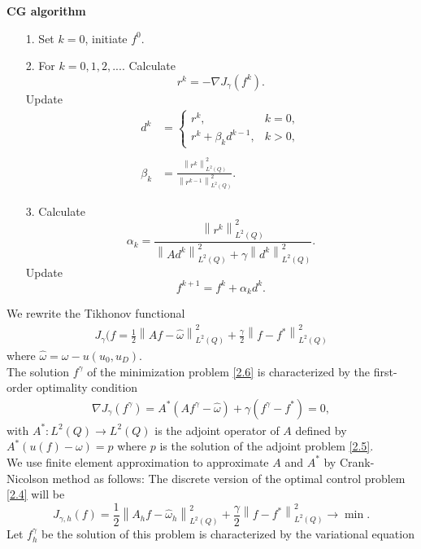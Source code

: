 \documentclass[twocolumn]{article}
\begin{document}
\noindent \textbf{CG algorithm}
\begin{itemize}
	\item[1.] Set $k=0$, initiate $f^0$.
	\item[2.] For $k=0, 1, 2,...$. Calculate
	$$r^k=-\nabla J_\gamma(f^k).$$
	Update\\
	\begin{align*}
	d^k&=\left\{\begin{array}{ll}
	r^k,& k=0,\\
	r^k+\beta_kd^{k-1},& k>0,
	\end{array}\right.\\\\
	\beta_k&=\frac{\left\|r^k\right\|^2_{L^2(Q)}}{\left\|r^{k-1}\right\|^2_{L^2(Q)}}.
	\end{align*}
	\item[3.] Calculate
	$$\alpha_k=\frac{\left\|r^k\right\|^2_{L^2(Q)}}{\displaystyle\left\|Ad^k\right\|^2_{L^2(Q)}+\gamma\left\|d^k\right\|^2_{L^2(Q)}}.$$
	Update
	$$f^{k+1}=f^{k}+\alpha_kd^k.$$
\end{itemize}
We rewrite the Tikhonov functional
\begin{align}
	J_\gamma(f=\frac{1}{2}\left\|Af-\hat{\omega}\right\|^2_{L^2(Q)}+\frac{\gamma}{2}\left\|f-f^*\right\|^2_{L^2(Q)}
\end{align}
where $\hat{\omega}=\omega- u(u_0, u_D)$.
\\
The solution $f^\gamma$ of the minimization problem \eqref{2.6} is characterized by the first-order optimality condition
\begin{align}\label{2.10}
	\nabla J_\gamma(f^\gamma)= A^*(Af^\gamma-\hat{\omega})+\gamma(f^\gamma-f^*)=0,
\end{align}
with $A^*: L^2(Q)\to L^2(Q)$ is the adjoint operator of $A$ defined by $A^*\left( u(f) - \omega\right) = p$ where $p$ is the solution of the adjoint problem \eqref{2.5}. 
\\
We use finite element approximation to approximate $A$ and $A^*$ by Crank-Nicolson method as follows: The discrete version of the optimal control problem \eqref{2.4} will be
$$J_{\gamma, h}(f)=\frac{1}{2}\left\|A_hf-\hat{\omega}_h\right\|^2_{L^2(Q)}+\frac{\gamma}{2}\left\|f-f^*\right\|^2_{L^2(Q)}\to \min.$$
Let $f^\gamma_h$ be the solution of this problem is characterized by the variational equation
\end{document}
